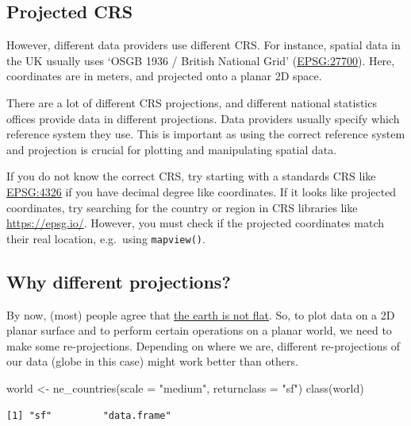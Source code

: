 \documentclass[
  letterpaper,
  DIV=11,
  numbers=noendperiod]{scrreprt}
\newenvironment{Shaded}{\begin{snugshade}}{\end{snugshade}}
\newcommand{\AttributeTok}[1]{\textcolor[rgb]{0.40,0.45,0.13}{#1}}
\newcommand{\FunctionTok}[1]{\textcolor[rgb]{0.28,0.35,0.67}{#1}}
\newcommand{\NormalTok}[1]{\textcolor[rgb]{0.00,0.23,0.31}{#1}}
\newcommand{\OtherTok}[1]{\textcolor[rgb]{0.00,0.23,0.31}{#1}}
\newcommand{\StringTok}[1]{\textcolor[rgb]{0.13,0.47,0.30}{#1}}
\begin{document}
\hypertarget{projected-crs}{%
\subsection{Projected CRS}\label{projected-crs}}

However, different data providers use different CRS. For instance,
spatial data in the UK usually uses `OSGB 1936 / British National Grid'
(\href{https://epsg.io/27700}{EPSG:27700}). Here, coordinates are in
meters, and projected onto a planar 2D space.

There are a lot of different CRS projections, and different national
statistics offices provide data in different projections. Data providers
usually specify which reference system they use. This is important as
using the correct reference system and projection is crucial for
plotting and manipulating spatial data.

If you do not know the correct CRS, try starting with a standards CRS
like \href{https://epsg.io/4326}{EPSG:4326} if you have decimal degree
like coordinates. If it looks like projected coordinates, try searching
for the country or region in CRS libraries like \url{https://epsg.io/}.
However, you must check if the projected coordinates match their real
location, e.g.~using \texttt{mapview()}.

\hypertarget{why-different-projections}{%
\subsection{Why different
projections?}\label{why-different-projections}}

By now, (most) people agree that
\href{https://r-spatial.org/r/2020/06/17/s2.html}{the earth is not
flat}. So, to plot data on a 2D planar surface and to perform certain
operations on a planar world, we need to make some re-projections.
Depending on where we are, different re-projections of our data (globe
in this case) might work better than others.

\begin{Shaded}
\begin{Highlighting}[]
\NormalTok{world }\OtherTok{\textless{}{-}} \FunctionTok{ne\_countries}\NormalTok{(}\AttributeTok{scale =} \StringTok{"medium"}\NormalTok{, }\AttributeTok{returnclass =} \StringTok{"sf"}\NormalTok{)}
\FunctionTok{class}\NormalTok{(world)}
\end{Highlighting}
\end{Shaded}

\begin{verbatim}
[1] "sf"         "data.frame"
\end{verbatim}
\end{document}
